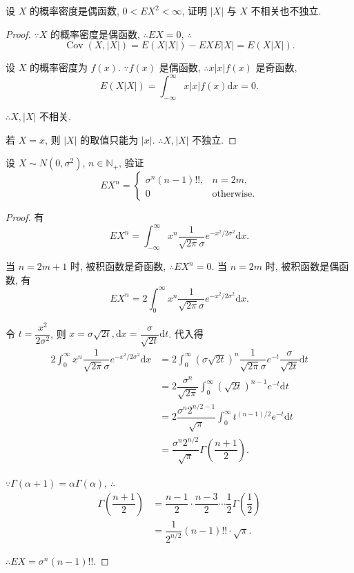\documentclass[color=black,device=normal,lang=cn]{elegantnote}
\numberwithin{equation}{section}
\theoremstyle{plain}
\numberwithin{exercise}{exsection}
\begin{document}
\begin{exercise}%
    设 $X$ 的概率密度是偶函数, $0<EX^2<\infty$, 证明 $|X|$ 与 $X$ 不相关也不独立.
\end{exercise}
\begin{proof}
    $\because X$ 的概率密度是偶函数, $\therefore EX=0$, $\therefore$
    \[\operatorname{Cov}(X,|X|)=E(X|X|)-EXE|X|=E(X|X|).\]

    设 $X$ 的概率密度为 $f(x)$. $\because f(x)$ 是偶函数, $\therefore x|x|f(x)$ 是奇函数,
    \[E(X|X|)=\int_{-\infty}^\infty x|x|f(x)\mathrm{d}x=0.\]

    $\therefore X,|X|$ 不相关.

    若 $X=x$, 则 $|X|$ 的取值只能为 $|x|$. $\therefore X,|X|$ 不独立.
\end{proof}
\begin{exercise}%
    设 $X\sim N(0,\sigma^2)$, $n\in\mathbb{N}_+$, 验证
    \[EX^n=\begin{cases}
        \sigma^n(n-1)!!, & n=2m, \\
        0 & \text{otherwise}.
    \end{cases}\]
\end{exercise}
\begin{proof}
    有
    \[EX^n=\int_{-\infty}^\infty x^n\dfrac{1}{\sqrt{2\pi}\sigma}e^{-x^2/2\sigma^2}\mathrm{d}x.\]

    当 $n=2m+1$ 时, 被积函数是奇函数, $\therefore EX^n=0$. 当 $n=2m$ 时, 被积函数是偶函数, 有
    \[EX^n=2\int_0^\infty x^n\dfrac{1}{\sqrt{2\pi}\sigma}e^{-x^2/2\sigma^2}\mathrm{d}x.\]

    令 $t=\dfrac{x^2}{2\sigma^2}$, 则 $x=\sigma\sqrt{2t},\mathrm{d}x=\dfrac{\sigma}{\sqrt{2t}}\mathrm{d}t$. 代入得
    \begin{align*}
        2\int_0^\infty x^n\dfrac{1}{\sqrt{2\pi}\sigma}e^{-x^2/2\sigma^2}\mathrm{d}x & =2\int_0^\infty(\sigma\sqrt{2t})^n\dfrac{1}{\sqrt{2\pi}\sigma}e^{-t}\dfrac{\sigma}{\sqrt{2t}}\mathrm{d}t \\
        & =2\dfrac{\sigma^n}{\sqrt{2\pi}}\int_0^\infty(\sqrt{2t})^{n-1}e^{-t}\mathrm{d}t \\
        & =2\dfrac{\sigma^n2^{n/2-1}}{\sqrt{\pi}}\int_0^\infty t^{(n-1)/2}e^{-t}\mathrm{d}t \\
        & =\dfrac{\sigma^n2^{n/2}}{\sqrt{\pi}}\Gamma\left(\dfrac{n+1}{2}\right).
    \end{align*}

    $\because\Gamma(\alpha+1)=\alpha\Gamma(\alpha)$, $\therefore$
    \begin{align*}
        \Gamma\left(\dfrac{n+1}{2}\right) & =\dfrac{n-1}{2}\cdot\dfrac{n-3}{2}\cdots\dfrac{1}{2}\Gamma\left(\dfrac{1}{2}\right) \\
        & =\dfrac{1}{2^{n/2}}(n-1)!!\cdot\sqrt{\pi}.
    \end{align*}

    $\therefore EX=\sigma^n(n-1)!!$.
\end{proof}
\end{document}
